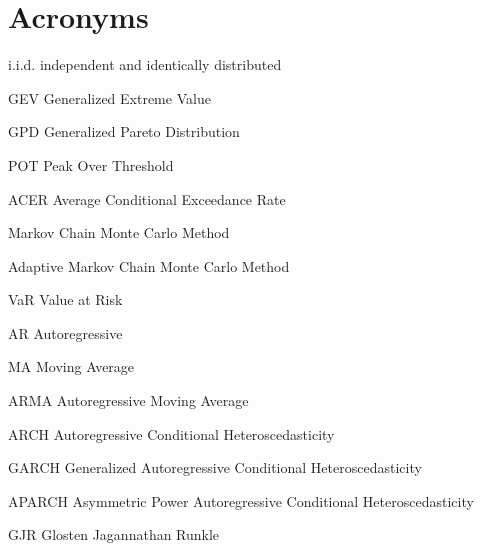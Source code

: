 
\chapter{Acronyms}
\begin{description}
\item{i.i.d.} independent and identically distributed
\item{GEV} Generalized Extreme Value
\item{GPD} Generalized Pareto Distribution
\item{POT} Peak Over Threshold
\item{ACER} Average Conditional Exceedance Rate
\item[MCMC] Markov Chain Monte Carlo Method
\item[AMCMC] Adaptive Markov Chain Monte Carlo Method
\item{VaR} Value at Risk
\item{AR} Autoregressive
\item{MA} Moving Average
\item{ARMA} Autoregressive Moving Average
\item{ARCH} Autoregressive Conditional Heteroscedasticity
\item{GARCH} Generalized Autoregressive Conditional Heteroscedasticity
\item{APARCH} Asymmetric Power Autoregressive Conditional Heteroscedasticity
\item{GJR} Glosten Jagannathan Runkle
\
\end{description}